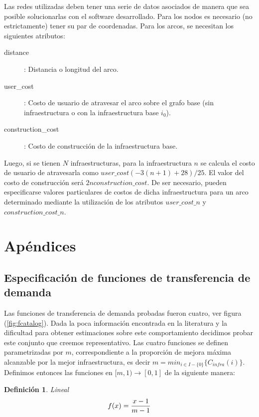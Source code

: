 \documentclass{article}
\newtheorem{definition}{Definición}
\begin{document}
  Las redes utilizadas deben tener una serie de datos asociados de manera que sea posible solucionarlas con el software desarrollado. Para los nodos es necesario (no estrictamente) tener su par de coordenadas. Para los arcos, se necesitan los siguientes atributos:

  \begin{description}
    \item[distance]: Distancia o longitud del arco.
    \item[user\_cost]: Costo de usuario de atravesar el arco sobre el grafo base (sin infraestructura o con la infraestructura base $i_0$).
    \item[construction\_cost]: Costo de construcción de la infraestructura base.
  \end{description}

  Luego, si se tienen $N$ infraestructuras, para la infraestructura $n$ se calcula el costo de usuario de atravesarla como $user\_cost (-3 (n + 1) + 28) / 25$. El valor del costo de construcción será $2 n construction\_cost$. De ser necesario, pueden especificarse valores particulares de costos de dicha infraestructura para un arco determinado mediante la utilización de los atributos $user\_cost\_n$ y $construction\_cost\_n$.

  \section{Apéndices}

  \subsection{Especificación de funciones de transferencia de demanda}

  Las funciones de transferencia de demanda probadas fueron cuatro, ver figura (\ref{fig:fcatalog}). Dada la poca información encontrada en la literatura y la dificultad para obtener estimaciones sobre este comportamiento decidimos probar este conjunto que creemos representativo. Las cuatro funciones se definen parametrizadas por $m$, correspondiente a la proporción de mejora máxima alcanzable por la mejor infraestructura, es decir $m = min_{i \in I - \{0\}} \{ C_{infra}(i) \}$. Definimos entonces las funciones en $[m, 1) \rightarrow [0, 1]$ de la siguiente manera:

  \begin{definition}
    Lineal
    \begin{align}
        f(x) = {x -1 \over m - 1}
    \end{align}
  \end{definition}
\end{document}
